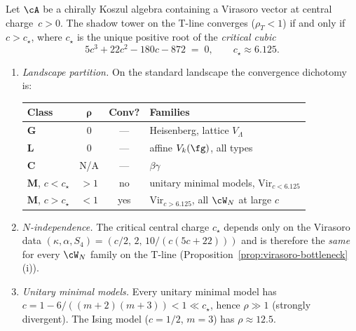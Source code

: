 \begin{proposition}
\label{prop:critical-cubic-convergence}
\ClaimStatusProvedHere
{}
Let $\cA$ be a chirally Koszul algebra containing a
Virasoro vector at central charge~$c > 0$.
The shadow tower on the T-line converges
\textup{(}$\rho_T < 1$\textup{)} if and only if
$c > c_\star$, where $c_\star$ is the unique
positive root of the \emph{critical cubic}
\begin{equation}\label{eq:critical-cubic-threshold}
  5c^3 + 22c^2 - 180c - 872 \;=\; 0,
  \qquad c_\star \approx 6.125.
\end{equation}
\begin{enumerate}[label=\textup{(\roman*)}]
\item \emph{Landscape partition.}\enspace
  On the standard landscape the convergence
  dichotomy is:
  \begin{center}
  \renewcommand{\arraystretch}{1.2}
  \begin{tabular}{lccl}
  \toprule
  \textbf{Class} & $\boldsymbol{\rho}$ &
    \textbf{Conv?} & \textbf{Families} \\
  \midrule
  $\mathbf{G}$ & $0$ & \textup{---} &
    Heisenberg, lattice $V_\Lambda$ \\
  $\mathbf{L}$ & $0$ & \textup{---} &
    affine $V_k(\fg)$, all types \\
  $\mathbf{C}$ & N/A & \textup{---} &
    $\beta\gamma$ \\
  $\mathbf{M}$, $c < c_\star$ & $> 1$ & no &
    unitary minimal models, $\mathrm{Vir}_{c<6.125}$ \\
  $\mathbf{M}$, $c > c_\star$ & $< 1$ & yes &
    $\mathrm{Vir}_{c>6.125}$, all $\cW_N$ at large $c$ \\
  \bottomrule
  \end{tabular}
  \end{center}

\item \emph{$N$-independence.}\enspace
  The critical central charge $c_\star$ depends
  only on the Virasoro data
  $(\kappa, \alpha, S_4)
  = (c/2,\, 2,\, 10/(c(5c{+}22)))$
  and is therefore the \emph{same} for every
  $\cW_N$ family on the T-line
  \textup{(}Proposition~\textup{\ref{prop:virasoro-bottleneck}(i))}.

\item \emph{Unitary minimal models.}\enspace
  Every unitary minimal model has
  $c = 1 - 6/((m{+}2)(m{+}3)) < 1 \ll c_\star$,
  hence $\rho \gg 1$ \textup{(}strongly divergent\textup{)}.
  The Ising model ($c = 1/2$, $m = 3$) has $\rho \approx 12.5$.
\end{enumerate}
\end{proposition}

